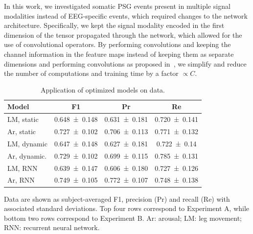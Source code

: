 In this work, we investigated somatic \ac{PSG} events present in multiple signal modalities instead of \ac{EEG}-specific events, which required changes to the network architecture. 
Specifically, we kept the signal modality encoded in the first dimension of the tensor propagated through the network, which allowed for the use of \oned convolutional operators. 
By performing \oned convolutions and keeping the channel information in the feature maps instead of keeping them as separate dimensions and performing \twod convolutions as proposed in~\cite{Chambon2018b,Chambon2019}, we simplify and reduce the number of computations and training time by a factor $\propto C$. 
\begin{table}[tb]
    \small
    \centering
    \begin{threeparttable}
    \caption[Optimized test performance]{Application of optimized models on \test data.}
    \label{tab:paperiv-test_results}
    \begin{tabular}{@{}lSSS@{}} \toprule
        \textbf{Model} & \textbf{F1} & \textbf{Pr} & \textbf{Re} \\ \midrule
        \ac{LM}, static & \num{0.648 \pm 0.148} & \num{0.631 \pm 0.181} & \num{0.720 \pm 0.141} \\
        \ac{Ar}, static & \num{0.727 \pm 0.102} & \num{0.706 \pm 0.113} & \num{0.771 \pm 0.132} \\
        \ac{LM}, dynamic & \num{0.647 \pm 0.148} & \num{0.627 \pm 0.181} & \num{0.722 \pm 0.14} \\
        \ac{Ar}, dynamic. & \num{0.729 \pm 0.102} & \num{0.699 \pm 0.115} & \num{0.785 \pm 0.131} \\ \midrule
        \ac{LM}, \ac{RNN} & \num{0.639 \pm 0.147} & \num{0.606 \pm 0.180} & \num{0.727 \pm 0.126} \\
        \ac{Ar}, \ac{RNN} & \num{0.749 \pm 0.105} & \num{0.772 \pm 0.107} & \num{0.748 \pm 0.138} \\ \bottomrule
    \end{tabular}
    \begin{tablenotes}
    \item Data are shown as subject-averaged F1, precision (Pr) and recall (Re) with associated standard deviations. Top four rows correspond to Experiment A, while bottom two rows correspond to Experiment B. \ac{Ar}: arousal; \ac{LM}: leg movement; \ac{RNN}: recurrent neural network.
    \end{tablenotes}
    \end{threeparttable}
\end{table}

